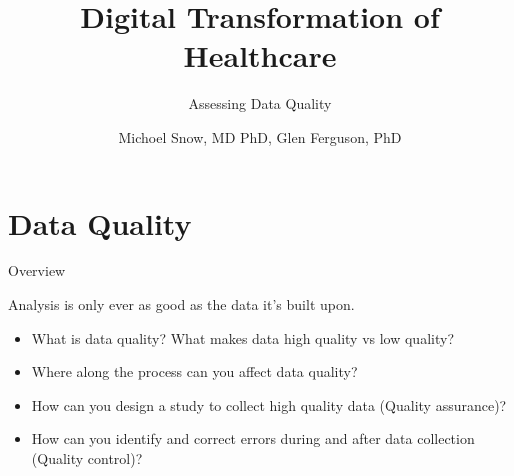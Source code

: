 \documentclass[10pt, xcolor=table]{beamer}
\title{Digital Transformation of Healthcare}
\subtitle{Assessing Data Quality}
\date{}
\author{Michoel Snow, MD PhD, Glen Ferguson, PhD}
\institute{Center for Health Data Innovations}
\begin{document}
\maketitle

\section{Data Quality}


\begin{frame}{Overview}
	\begin{center}
		Analysis is only ever as good as the data it's built upon.
	\end{center}
	\begin{itemize}[<+(1)->]
		\item What is data quality? What makes data high quality vs low quality?
		\item Where along the process can you affect data quality?
		\item How can you design a study to collect high quality data (Quality assurance)?
		\item How can you identify and correct errors during and after data collection (Quality control)?
	\end{itemize}
\end{frame}
\end{document}
